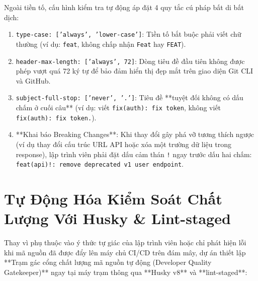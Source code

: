 \documentclass[12pt,a4paper,oneside]{book}
\begin{document}
\begin{infobox}
  Ngoài tiền tố, cấu hình kiểm tra tự động áp đặt 4 quy tắc cú pháp bất di bất dịch:
  \begin{enumerate}
    \item \texttt{type-case: ['always', 'lower-case']}: Tiền tố bắt buộc phải viết chữ thường (ví dụ: \texttt{feat}, không chấp nhận \texttt{Feat} hay \texttt{FEAT}).
    \item \texttt{header-max-length: ['always', 72]}: Dòng tiêu đề đầu tiên không được phép vượt quá 72 ký tự để bảo đảm hiển thị đẹp mắt trên giao diện Git CLI và GitHub.
    \item \texttt{subject-full-stop: ['never', '.']}: Tiêu đề **tuyệt đối không có dấu chấm ở cuối câu** (ví dụ: viết \texttt{fix(auth): fix token}, không viết \texttt{fix(auth): fix token.}).
    \item **Khai báo Breaking Changes**: Khi thay đổi gây phá vỡ tương thích ngược (ví dụ thay đổi cấu trúc URL API hoặc xóa một trường dữ liệu trong response), lập trình viên phải đặt dấu cảm thán \texttt{!} ngay trước dấu hai chấm: \texttt{feat(api)!: remove deprecated v1 user endpoint}.
  \end{enumerate}
\end{infobox}

\section{Tự Động Hóa Kiểm Soát Chất Lượng Với Husky \& Lint-staged}
Thay vì phụ thuộc vào ý thức tự giác của lập trình viên hoặc chỉ phát hiện lỗi khi mã nguồn đã được đẩy lên máy chủ CI/CD trên đám mây, dự án thiết lập **Trạm gác cổng chất lượng mã nguồn tự động (Developer Quality Gatekeeper)** ngay tại máy trạm thông qua **Husky v8** và **lint-staged**:
\end{document}
